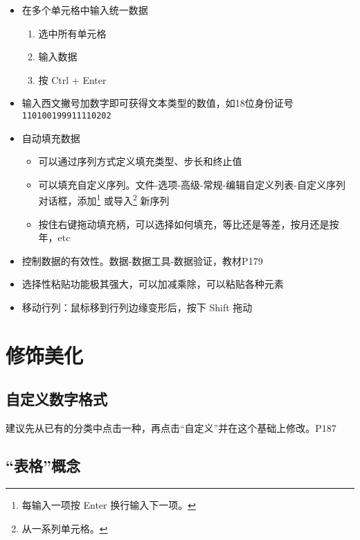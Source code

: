 \documentclass[]{ctexbook}
\providecommand{\tightlist}{%
  \setlength{\itemsep}{0pt}\setlength{\parskip}{0pt}}
\begin{document}
\begin{itemize}
\tightlist
\item
  在多个单元格中输入统一数据

  \begin{enumerate}
  \def\labelenumi{\arabic{enumi}.}
  \tightlist
  \item
    选中所有单元格
  \item
    输入数据
  \item
    按 Ctrl + Enter
  \end{enumerate}
\item
  输入西文撇号\texttt{\textquotesingle{}}加数字即可获得文本类型的数值，如18位身份证号\texttt{\textquotesingle{}110100199911110202}
\item
  自动填充数据

  \begin{itemize}
  \tightlist
  \item
    可以通过序列方式定义填充类型、步长和终止值
  \item
    可以填充自定义序列。文件-选项-高级-常规-编辑自定义列表-自定义序列对话框，添加\footnote{每输入一项按 Enter 换行输入下一项。} 或导入\footnote{从一系列单元格。} 新序列
  \item
    按住右键拖动填充柄，可以选择如何填充，等比还是等差，按月还是按年，etc
  \end{itemize}
\item
  控制数据的有效性。数据-数据工具-数据验证，教材P179
\item
  选择性粘贴功能极其强大，可以加减乘除，可以粘贴各种元素
\item
  移动行列：鼠标移到行列边缘变形后，按下 Shift 拖动
\end{itemize}

\hypertarget{ux4feeux9970ux7f8eux5316}{%
\section{修饰美化}\label{ux4feeux9970ux7f8eux5316}}

\hypertarget{ux81eaux5b9aux4e49ux6570ux5b57ux683cux5f0f}{%
\subsection{自定义数字格式}\label{ux81eaux5b9aux4e49ux6570ux5b57ux683cux5f0f}}

建议先从已有的分类中点击一种，再点击``自定义''并在这个基础上修改。P187

\hypertarget{ux8868ux683cux6982ux5ff5}{%
\subsection{``表格''概念}\label{ux8868ux683cux6982ux5ff5}}
\end{document}
